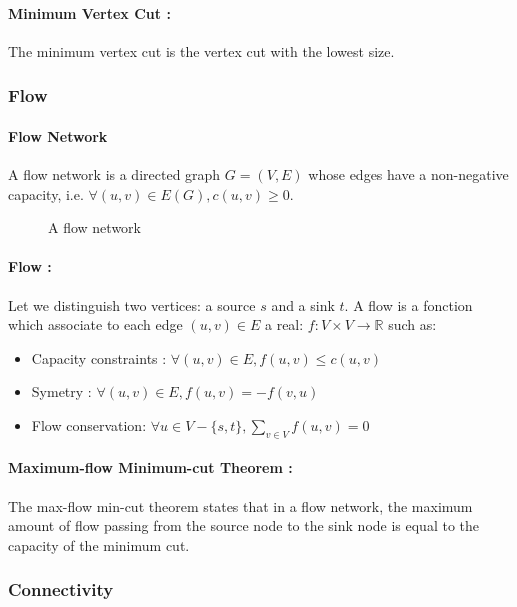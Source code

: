 \paragraph{Minimum Vertex Cut :}
The minimum vertex cut is the vertex cut with the lowest size.

\subsubsection{Flow}
\paragraph{Flow Network}
A flow network is a directed graph $G=(V,E)$ whose edges have a non-negative
capacity, i.e. $\forall (u,v) \in E(G), c(u,v) \geq 0$.

\begin{figure}[!h]
  \begin{center}
    
  \end{center}
  \caption{A flow network}
\end{figure}

\paragraph{Flow :}
Let we distinguish two vertices: a source $s$ and a sink $t$.
A flow is a fonction which associate to each edge $(u,v) \in E$ a real:
$f: V \times V \rightarrow \mathbb{R}$ such as:
\begin{itemize}
    \item Capacity constraints : $\forall (u,v) \in E, f(u,v) \leq c(u,v)$
    \item Symetry : $\forall (u,v) \in E, f(u,v) = - f(v,u) $
    \item Flow conservation: $\forall u \in V - \{s,t\}, \sum_{v \in V}f(u,v) = 0$ 
\end{itemize}


\paragraph{Maximum-flow Minimum-cut Theorem :}
The max-flow min-cut theorem states that in a flow network, the maximum amount
of flow passing from the source node to the sink node is equal to the capacity
of the minimum cut.


\subsubsection{Connectivity}
